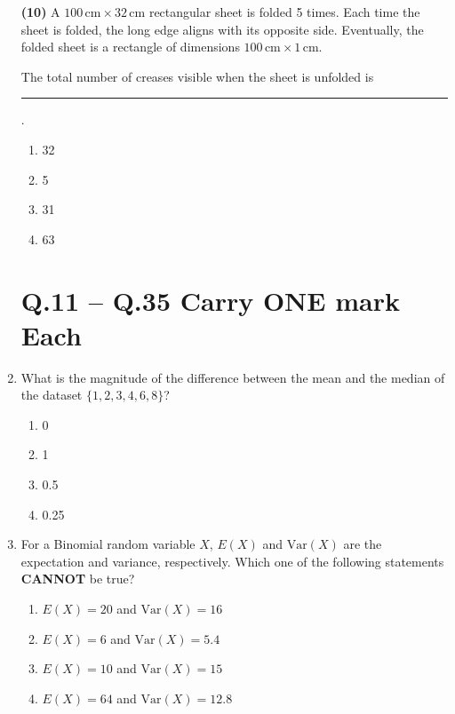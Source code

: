\documentclass[journal]{IEEEtran}
\begin{document}
\begin{enumerate}
   \textbf {(10)}
A \(100 \, \text{cm} \times 32 \, \text{cm}\) rectangular sheet is folded 5 times. Each time the sheet is folded, the long edge aligns with its opposite side. Eventually, the folded sheet is a rectangle of dimensions \(100 \, \text{cm} \times 1 \, \text{cm}\).



The total number of creases visible when the sheet is unfolded is \rule{2cm}{0.15mm}.



\begin{enumerate}
    \item 32
    \item 5
    \item 31
    \item 63
\end{enumerate}
\hfill{}

\section*{Q.11 -- Q.35 Carry ONE mark Each}

\item  What is the magnitude of the difference between the mean and the median of the dataset \(\{1, 2, 3, 4, 6, 8\}\)?

\begin{enumerate}
    \item 0
    \item 1
    \item 0.5
    \item 0.25
\end{enumerate}
\hfill{}

 \item 
For a Binomial random variable \(X\), \(E(X)\) and \(\text{Var}(X)\) are the expectation and variance, respectively. Which one of the following statements \textbf{CANNOT} be true?

\begin{enumerate}
    \item \(E(X) = 20\) and \(\text{Var}(X) = 16\)
    \item \(E(X) = 6\) and \(\text{Var}(X) = 5.4\)
    \item \(E(X) = 10\) and \(\text{Var}(X) = 15\)
    \item \(E(X) = 64\) and \(\text{Var}(X) = 12.8\)
\end{enumerate}
\hfill{}


\end{enumerate}
\end{document}
